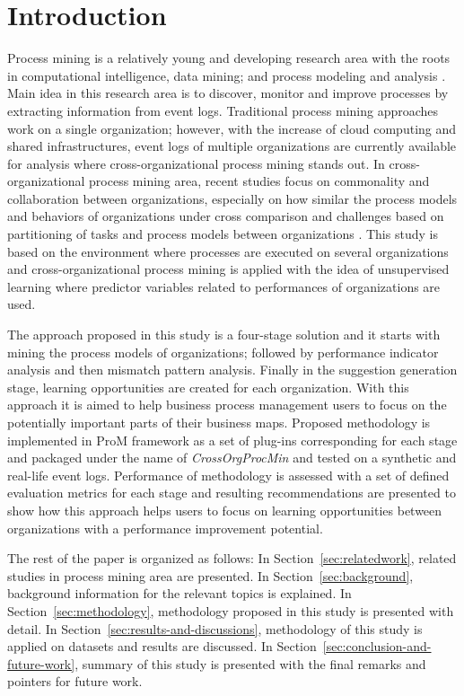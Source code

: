 \section{Introduction}
\label{sec:introduction}

Process mining is a relatively young and developing research area with the roots in computational intelligence, data mining; and process modeling and analysis \cite{van2012process}. Main idea in this research area is to discover, monitor and improve processes by extracting information from event logs. Traditional process mining approaches work on a single organization; however, with the increase of cloud computing and shared infrastructures, event logs of multiple organizations are currently available for analysis where cross-organizational process mining stands out. In cross-organizational process mining area, recent studies focus on commonality and collaboration between organizations, especially on how similar the process models and behaviors of organizations under cross comparison \cite{buijs2012towards} and challenges based on partitioning of tasks and process models between organizations \cite{van2011intra}. This study is based on the environment where processes are executed on several organizations and cross-organizational process mining is applied with the idea of unsupervised learning where predictor variables related to performances of organizations are used.

The approach proposed in this study is a four-stage solution and it starts with mining the process models of organizations; followed by performance indicator analysis and then mismatch pattern analysis. Finally in the suggestion generation stage, learning opportunities are created for each organization. With this approach it is aimed to help business process management users to focus on the potentially important parts of their business maps. Proposed methodology is implemented in ProM framework \cite{verbeek2010prom} as a set of plug-ins corresponding for each stage and packaged under the name of \textit{CrossOrgProcMin} and tested on a synthetic and real-life event logs. Performance of methodology is assessed with a set of defined evaluation metrics for each stage and resulting recommendations are presented to show how this approach helps users to focus on learning opportunities between organizations with a performance improvement potential.

The rest of the paper is organized as follows: In Section~\ref{sec:relatedwork}, related studies in process mining area are presented. In Section~\ref{sec:background}, background information for the relevant topics is explained. In Section~\ref{sec:methodology}, methodology proposed in this study is presented with detail. In Section~\ref{sec:results-and-discussions}, methodology of this study is applied on datasets and results are discussed. In Section~\ref{sec:conclusion-and-future-work}, summary of this study is presented with the final remarks and pointers for future work. 